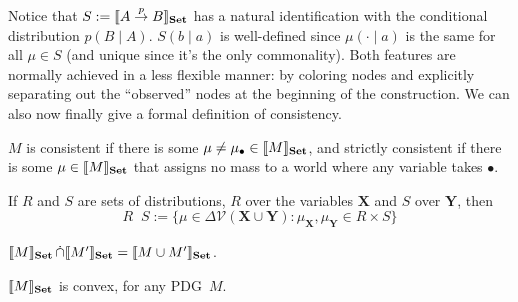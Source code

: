 \documentclass{article}
\newcommand\Set{\textbf{Set}}
\newcommand\bmu{\boldsymbol{\mu}}
\newcommand{\MN}{PDG}
\DeclareMathOperator\dcap{\mathop{\dot\cap}}
\begin{document}
	
	Notice that $S := \bbr{
		A \overset{p}{\to} B
	}_\Set$ has a natural identification with 
	the conditional distribution $p( B \mid A)$. $S(b\mid a)$ is well-defined since $\mu(\cdot\mid a)$ is the same for all $\mu \in S$ (and unique since it's the only commonality). Both features are normally achieved in a less flexible manner: by coloring nodes and explicitly separating out the ``observed'' nodes at the beginning of the construction.
	We can also now finally give a formal definition of consistency.
	\begin{defn} \label{def:weak-consistent}
		$M$ is consistent if there is some $\mu \neq \mu_\bullet \in \bbr{M}_\Set$, and strictly consistent if there is some $\mu \in \bbr{M}_\Set$ that assigns no mass to a world where any variable takes $\bullet$.
	\end{defn}
	
	
	If $R$ and $S$ are sets of distributions, $R$ over the variables $\mathbf X$ and $S$ over $\mathbf Y$, then
	$$R \dcap S := \{ \mu \in  \Delta \mathcal V(\mathbf X \cup \mathbf Y) : \mu_{\mathbf X}, \mu_{\mathbf Y} \in R \times S \}  $$
	\begin{prop}
		$\bbr{M}_\Set \dcap \bbr{M'}_\Set = \bbr{M \cup M'}_\Set$.
	\end{prop}

	
	
	\begin{lemma}[restate=thmsetconvex] 
		\label{prop:convex}
		$\bbr{M}_\Set$ is convex, for any \MN\ $M$.
	\end{lemma}%


\end{document}
